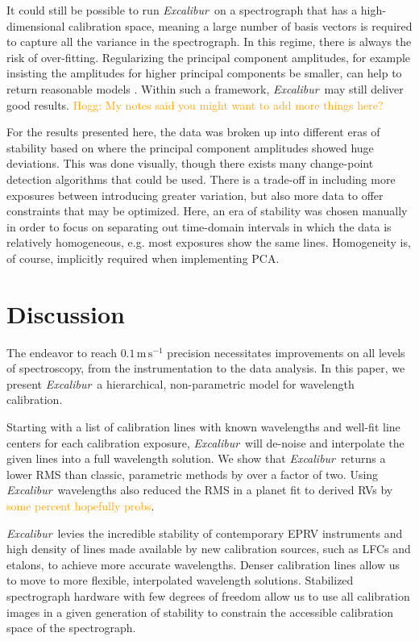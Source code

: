 \documentclass[modern]{aastex63}
\newcommand{\project}[1]{\textsl{#1}}
\newcommand{\name}{\project{Excalibur}}
\newcommand{\lz}[1]{\textcolor{orange}{#1}}
\newcommand{\mps}{\mathrm{m\,s^{-1}}}
\begin{document}
It could still be possible to run \name\ on a spectrograph that has a high-dimensional calibration space, meaning a large number of basis vectors is required to capture all the variance in the spectrograph.  In this regime, there is always the risk of over-fitting.  Regularizing the principal component amplitudes, for example insisting the amplitudes for higher principal components be smaller, can help to return reasonable models \citep{formanmackey2015} .  Within such a framework, \name\ may still deliver good results.
\lz{Hogg: My notes said you might want to add more things here?}

For the results presented here, the data was broken up into different eras of stability based on where the principal component amplitudes showed huge deviations.  This was done visually, though there exists many change-point detection algorithms that could be used.  There is a trade-off in including more exposures between introducing greater variation, but also more data to offer constraints that may be optimized.  Here, an era of stability was chosen  manually in order to focus on separating out time-domain intervals in which the data is relatively homogeneous, e.g. most exposures show the same lines.  Homogeneity is, of course, implicitly required when implementing PCA.


\section{Discussion} \label{sec:discussion}
The endeavor to reach $0.1\,\mps$ precision necessitates improvements on all levels of spectroscopy, from the instrumentation to the data analysis.  In this paper, we present \name\, a hierarchical, non-parametric model for wavelength calibration.  

Starting with a list of calibration lines with known wavelengths and well-fit line centers for each calibration exposure, \name\ will de-noise and interpolate the given lines into a full wavelength solution.  We show that \name\ returns a lower RMS than classic, parametric methods by over a factor of two.  Using \name\ wavelengths also reduced the RMS in a planet fit to derived RVs by \lz{some percent hopefully probs}.

\name\ levies the incredible stability of contemporary EPRV instruments and high density of lines made available by new calibration sources, such as LFCs and etalons, to achieve more accurate wavelengths.  Denser calibration lines allow us to move to more flexible, interpolated wavelength solutions.  Stabilized spectrograph hardware with few degrees of freedom allow us to use all calibration images in a given generation of stability to constrain the accessible calibration space of the spectrograph.
\end{document}
